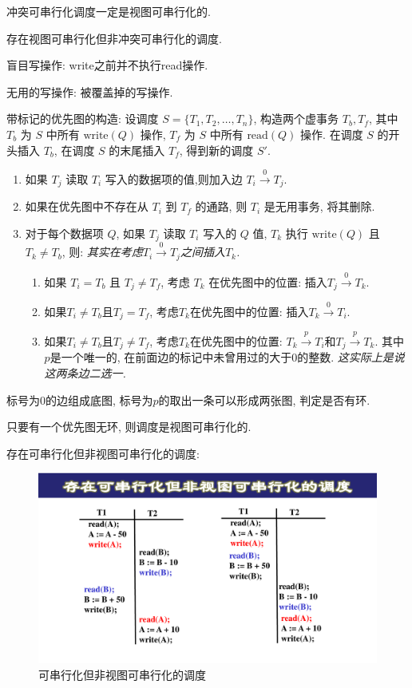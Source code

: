 \begin{corollary}
  冲突可串行化调度一定是视图可串行化的.
\end{corollary}

\begin{corollary}
  存在视图可串行化但非冲突可串行化的调度.
\end{corollary}

盲目写操作: write之前并不执行read操作.

无用的写操作: 被覆盖掉的写操作.

带标记的优先图的构造:
设调度 $ S = \{ T_1, T_2, \ldots, T_n \} $, 构造两个虚事务 $ T_b, T_f $, 
其中 $ T_b $ 为 $ S $ 中所有 $ \text{write}(Q) $ 操作, 
$ T_f $ 为 $ S $ 中所有 $ \text{read}(Q) $ 操作. 
在调度 $ S $ 的开头插入 $ T_b $, 在调度 $ S $ 的末尾插入 $ T_f $, 得到新的调度 $ S' $.
\begin{enumerate}
    \item 如果 $ T_j $ 读取 $ T_i $ 写入的数据项的值,则加入边 $ T_i \overset{0}{\to} T_j $.
    \item 如果在优先图中不存在从 $ T_i $ 到 $ T_f $ 的通路, 则 $ T_i $ 是无用事务, 将其删除.
    \item 对于每个数据项 $ Q $, 如果 $ T_j $ 读取 $ T_i $ 写入的 $ Q $ 值, $ T_k $ 执行 $ \text{write}(Q) $ 且 $ T_k \neq T_b $, 则: \textit{其实在考虑$T_i \overset{0}{\to} T_j$之间插入$T_k$.}
    \begin{enumerate}
        \item 如果 $ T_i = T_b $ 且 $ T_j \neq T_f $, 考虑 $ T_k $ 在优先图中的位置: 插入$T_j\overset{0}{\to}T_k$.
        \item 如果$T_i\neq T_b$且$T_j=T_f$, 考虑$T_k$在优先图中的位置: 插入$T_k\overset{0}{\to} T_i$.
        \item 如果$T_i\neq T_b$且$T_j\neq T_f$, 考虑$T_k$在优先图中的位置: $T_k\overset{p}{\to} T_i$和$T_j\overset{p}{\to} T_k$. 其中$p$是一个唯一的, 在前面边的标记中未曾用过的大于0的整数.
        \textit{这实际上是说这两条边二选一.}
    \end{enumerate}
\end{enumerate}
标号为0的边组成底图, 标号为$p$的取出一条可以形成两张图, 判定是否有环.

\begin{theorem}[视图可串行化判定准则]
  只要有一个优先图无环, 则调度是视图可串行化的.
\end{theorem}

存在可串行化但非视图可串行化的调度:
\begin{figure}[H]
    \centering
    \includegraphics[width=.7\textwidth]{./figure/可串行化.pdf}
    \caption{可串行化但非视图可串行化的调度}
\end{figure}


